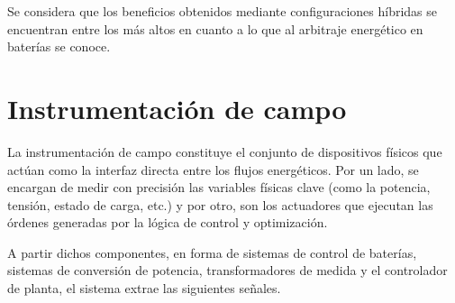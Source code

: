 Se considera que los beneficios obtenidos mediante configuraciones híbridas se encuentran entre los más altos en cuanto a lo que al arbitraje energético en baterías se conoce.

\section{Instrumentación de campo}
\label{makereference3.2}

La instrumentación de campo constituye el conjunto de dispositivos físicos que actúan como la interfaz directa entre los flujos energéticos. Por un lado, se encargan de medir con precisión las variables físicas clave (como la potencia, tensión, estado de carga, etc.) y por otro, son los actuadores que ejecutan las órdenes generadas por la lógica de control y optimización.

A partir dichos componentes, en forma de sistemas de control de baterías, sistemas de conversión de potencia, transformadores de medida y el controlador de planta, el sistema extrae las siguientes señales.

